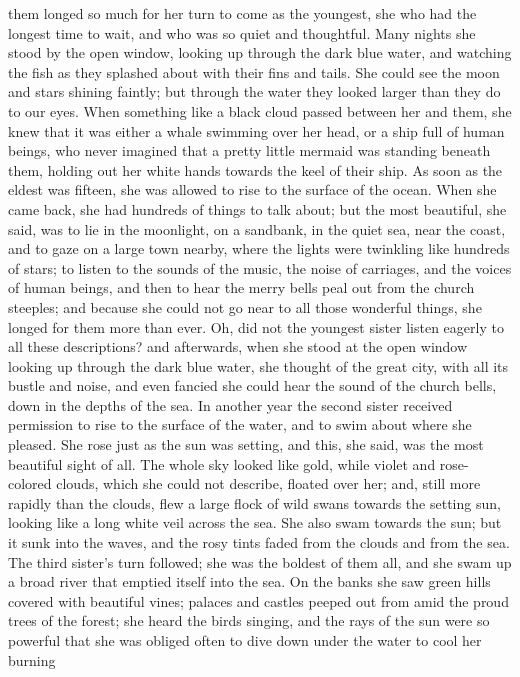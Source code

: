 them longed so much for her turn to come as the youngest, she who
had the longest time to wait, and who was so quiet and thoughtful.
Many nights she stood by the open window, looking up through the
dark blue water, and watching the fish as they splashed about with
their fins and tails. She could see the moon and stars shining
faintly; but through the water they looked larger than they do to
our eyes. When something like a black cloud passed between her and
them, she knew that it was either a whale swimming over her head, or a
ship full of human beings, who never imagined that a pretty little
mermaid was standing beneath them, holding out her white hands towards
the keel of their ship.
    As soon as the eldest was fifteen, she was allowed to rise to
the surface of the ocean. When she came back, she had hundreds of
things to talk about; but the most beautiful, she said, was to lie
in the moonlight, on a sandbank, in the quiet sea, near the coast, and
to gaze on a large town nearby, where the lights were twinkling like
hundreds of stars; to listen to the sounds of the music, the noise
of carriages, and the voices of human beings, and then to hear the
merry bells peal out from the church steeples; and because she could
not go near to all those wonderful things, she longed for them more
than ever. Oh, did not the youngest sister listen eagerly to all these
descriptions? and afterwards, when she stood at the open window
looking up through the dark blue water, she thought of the great city,
with all its bustle and noise, and even fancied she could hear the
sound of the church bells, down in the depths of the sea.
    In another year the second sister received permission to rise to
the surface of the water, and to swim about where she pleased. She
rose just as the sun was setting, and this, she said, was the most
beautiful sight of all. The whole sky looked like gold, while violet
and rose-colored clouds, which she could not describe, floated over
her; and, still more rapidly than the clouds, flew a large flock of
wild swans towards the setting sun, looking like a long white veil
across the sea. She also swam towards the sun; but it sunk into the
waves, and the rosy tints faded from the clouds and from the sea.
    The third sister's turn followed; she was the boldest of them all,
and she swam up a broad river that emptied itself into the sea. On the
banks she saw green hills covered with beautiful vines; palaces and
castles peeped out from amid the proud trees of the forest; she
heard the birds singing, and the rays of the sun were so powerful that
she was obliged often to dive down under the water to cool her burning
